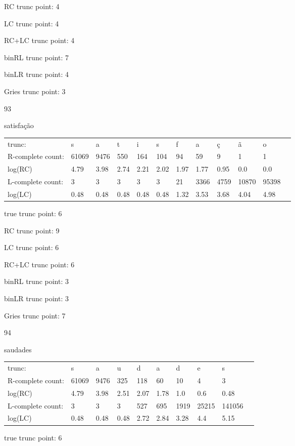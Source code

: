 \documentclass[10pt]{article}
\begin{document}
RC trunc point: 4

LC trunc point: 4

RC+LC trunc point: 4

binRL trunc point: 7

binLR trunc point: 4

Gries trunc point: 3

\newpage

93

satisfação

\begin{tabular}{l|lllllllllll}
trunc: & s & a & t & i & s & f & a & ç & ã & o & \\ 
R-complete count: & 61069 & 9476 & 550 & 164 & 104 & 94 & 59 & 9 & 1 & 1 & \\ 
log(RC) & 4.79 & 3.98 & 2.74 & 2.21 & 2.02 & 1.97 & 1.77 & 0.95 & 0.0 & 0.0 & \\ 
L-complete count: & 3 & 3 & 3 & 3 & 3 & 21 & 3366 & 4759 & 10870 & 95398 & \\ 
log(LC) & 0.48 & 0.48 & 0.48 & 0.48 & 0.48 & 1.32 & 3.53 & 3.68 & 4.04 & 4.98 & \\ 
\end{tabular}

true trunc point: 6

RC trunc point: 9

LC trunc point: 6

RC+LC trunc point: 6

binRL trunc point: 3

binLR trunc point: 3

Gries trunc point: 7

\vspace{1em}

94

saudades

\begin{tabular}{l|lllllllll}
trunc: & s & a & u & d & a & d & e & s & \\ 
R-complete count: & 61069 & 9476 & 325 & 118 & 60 & 10 & 4 & 3 & \\ 
log(RC) & 4.79 & 3.98 & 2.51 & 2.07 & 1.78 & 1.0 & 0.6 & 0.48 & \\ 
L-complete count: & 3 & 3 & 3 & 527 & 695 & 1919 & 25215 & 141056 & \\ 
log(LC) & 0.48 & 0.48 & 0.48 & 2.72 & 2.84 & 3.28 & 4.4 & 5.15 & \\ 
\end{tabular}

true trunc point: 6
\end{document}

